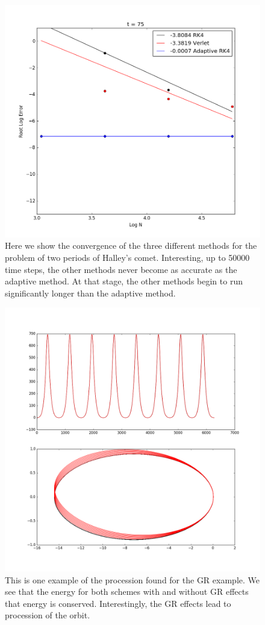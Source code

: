\documentclass{article}
\begin{document}
\begin{figure}[h]
    \includegraphics[width=\textwidth]{halleyconv.png}
    \caption{Here we show the convergence of the three different methods for the problem of two periods of Halley's comet. Interesting, up to 50000 time steps, the other methods never become as accurate as the adaptive method. At that stage, the other methods begin to run significantly longer than the adaptive method.}
    \label{fig:halleyconv}
\end{figure}

\begin{figure}[h]
    \includegraphics[width=\textwidth]{s2.png}
    \caption{This is one example of the procession found for the GR example. We see that the energy for both schemes with and without GR effects that energy is conserved. Interestingly, the GR effects lead to procession of the orbit.}
    \label{fig:gr}
\end{figure}
\end{document}
